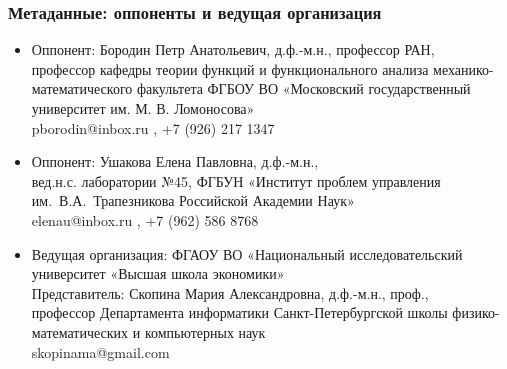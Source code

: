\begin{frame}\frametitle{Метаданные: оппоненты и ведущая организация}
	\begin{itemize}
		\item
			Оппонент: Бородин Петр Анатольевич, д.ф.-м.н., профессор РАН,
			\\
			профессор кафедры теории функций и функционального анализа механико-математического факультета
			ФГБОУ ВО «Московский государственный университет им. М. В. Ломоносова»
			\\
			pborodin@inbox.ru , +7 (926) 217 1347
		\item
			Оппонент: Ушакова Елена Павловна, д.ф.-м.н.,
			\\
			вед.н.с. лаборатории №45,
			ФГБУН «Институт проблем управления им.~В.А.~Трапезникова Российской Академии Наук»
			\\
			elenau@inbox.ru , +7 (962) 586 8768
		\item
			Ведущая организация:
			ФГАОУ ВО «Национальный исследовательский университет «Высшая школа экономики»
			\\
			Представитель:
			Скопина Мария Александровна, д.ф.-м.н., проф.,
			\\
			профессор Департамента информатики Санкт-Петербургской школы физико-математических и компьютерных наук
			\\
			skopinama@gmail.com
	\end{itemize}
\end{frame}

